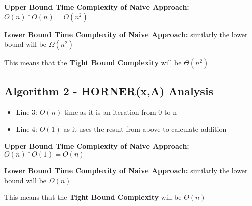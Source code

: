 \documentclass{article}
\begin{document}
\textbf{Upper Bound Time Complexity of Naive Approach: $O(n) * O(n) = O(n^2)$}

\mbox{}

\textbf{Lower Bound Time Complexity of Naive Approach:} similarly the lower bound will be $ \Omega(n^2)$

\mbox{}

This means that the \textbf{Tight Bound Complexity} will be $ \Theta(n^2)$

\subsection{Algorithm 2 - HORNER(x,A) Analysis}
\begin{itemize}
\item Line 3: $O(n)$ time as it is an iteration from 0 to n

\item Line 4: $O(1)$ as it uses the result from above to calculate addition

\end{itemize}


\textbf{Upper Bound Time Complexity of Naive Approach: $O(n) * O(1) = O(n)$}

\mbox{}

\textbf{Lower Bound Time Complexity of Naive Approach:} similarly the lower bound will be $ \Omega(n)$

\mbox{}

This means that the \textbf{Tight Bound Complexity} will be $ \Theta(n)$
\end{document}

